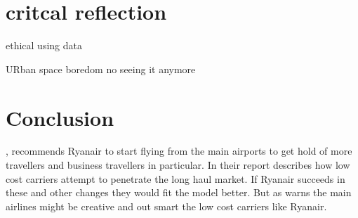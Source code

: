 \documentclass[a4paper, 11pt]{article}
\begin{document}
\section{critcal reflection}
\label{reaction}


ethical using data 

URban space
boredom no seeing it anymore





\section{Conclusion}




\cite{Diaconu}, recommends Ryanair to start flying from the main airports to get hold of more travellers and business travellers in particular. In their report \cite{Eurocontrol2018} describes how low cost carriers attempt to penetrate the long haul market. If Ryanair succeeds in these and other changes they would fit the model better. But as \cite{Christensen2015} warns the main airlines might be creative and out smart the low cost carriers like Ryanair.




\renewcommand{\textbf}{}
\renewcommand{\bf}{}
{}
\end{document}
